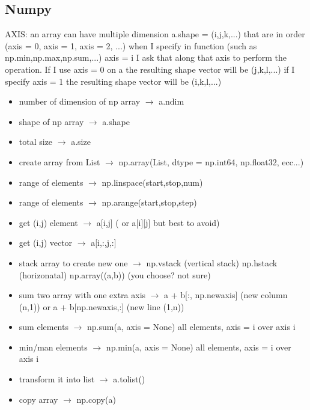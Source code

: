 \documentclass{article}
\begin{document}
\begin{multicols}{2}
\section{Numpy}
AXIS: an array can have multiple dimension a.shape = (i,j,k,...) that are in order (axis = 0, axis = 1, axis = 2, ...)
when I specify in function (such as np.min,np.max,np.sum,...) axis = i I ask that along that axis to perform the operation.
If I use axis = 0 on a the resulting shape vector will be (j,k,l,...) if I specify axis = 1 the resulting shape vector will be (i,k,l,...)

\begin{itemize}
\item number of dimension of np array $\rightarrow$ a.ndim
\item shape of np array $\rightarrow$ a.shape
\item total size  $\rightarrow$ a.size
\item create array from List $\rightarrow$ np.array(List, dtype = np.int64, np.float32, ecc...)
\item range of elements $\rightarrow$ np.linspace(start,stop,num)
\item range of elements $\rightarrow$ np.arange(start,stop,step)
\item get (i,j) element $\rightarrow$ a[i,j] ( or  a[i][j]  but best to avoid)
\item get (i,j) vector $\rightarrow$ a[i,:,j,:] 
\item stack array to create new one $\rightarrow$ np.vstack (vertical stack) np.hstack (horizonatal) np.array((a,b)) (you choose? not sure)
\item sum two array with one extra axis   $\rightarrow$ a + b[:, np.newaxis] (new column (n,1)) or a + b[np.newaxis,:] (new line (1,n))
\item sum  elements  $\rightarrow$ np.sum(a, axis = None) all elements, axis = i over axis i
\item min/man  elements  $\rightarrow$ np.min(a, axis = None) all elements, axis = i over axis i
\item transform it into list $\rightarrow$ a.tolist()
\item copy array $\rightarrow$ np.copy(a)
\end{itemize}

\end{multicols}
\end{document}
